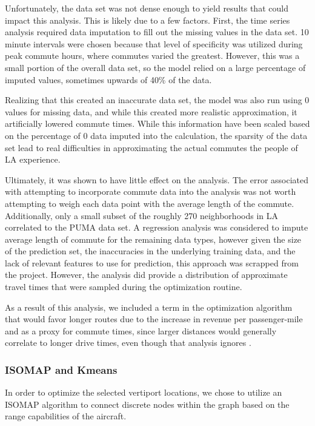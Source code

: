 \documentclass{article}
\begin{document}
Unfortunately, the data set was not dense enough to yield results that could impact this analysis. This is likely due to a few factors. First, the time series analysis required data imputation to fill out the missing values in the data set. 10 minute intervals were chosen because that level of specificity was utilized during peak commute hours, where commutes varied the greatest. However, this was a small portion of the overall data set, so the model relied on a large percentage of imputed values, sometimes upwards of 40\% of the data.

Realizing that this created an inaccurate data set, the model was also run using 0 values for missing data, and while this created more realistic approximation, it artificially lowered commute times. While this information have been scaled based on the percentage of 0 data imputed into the calculation, the sparsity of the data set lead to real difficulties in approximating the actual commutes the people of LA experience.

Ultimately, it was shown to have little effect on the analysis. The error associated with attempting to incorporate commute data into the analysis was not worth attempting to weigh each data point with the average length of the commute. Additionally, only a small subset of the roughly 270 neighborhoods in LA correlated to the PUMA data set. A regression analysis was considered to impute average length of commute for the remaining data types, however given the size of the prediction set, the inaccuracies in the underlying training data, and the lack of relevant features to use for prediction, this approach was scrapped from the project. However, the analysis did provide a distribution of approximate travel times that were sampled during the optimization routine.

As a result of this analysis, we included a term in the optimization algorithm that would favor longer routes due to the increase in revenue per passenger-mile and as a proxy for commute times, since larger distances would generally correlate to longer drive times, even though that analysis ignores .

\subsubsection{ISOMAP and Kmeans}
In order to optimize the selected vertiport locations, we chose to utilize an ISOMAP algorithm to connect discrete nodes within the graph based on the range capabilities of the aircraft. 
\end{document}
